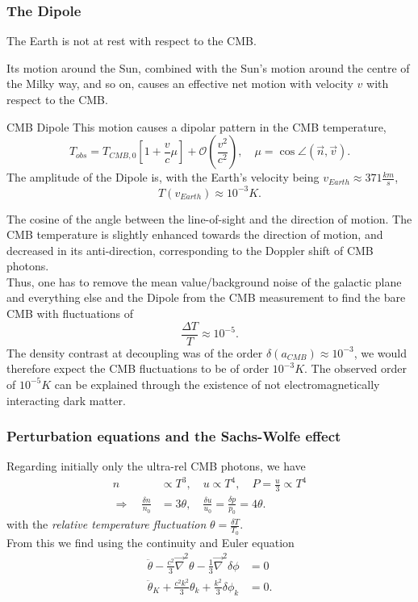 \subsubsection{The Dipole}
\begin{mybox}{}
	The Earth is not at rest with respect to the CMB.
\end{mybox}
Its motion around the Sun, combined with the Sun's motion around the centre of the Milky way, and so on, causes an effective net motion with velocity $v$ with respect to the CMB.
\begin{mybox}{CMB Dipole}
	This motion causes a dipolar pattern in the CMB temperature,\begin{equation}
		T_{obs} = T_{CMB,0} \left[1+\frac{v}{c} \mu\right] + \mathcal{O}\left(\frac{v^2}{c^2}\right), \quad \mu = \cos\angle(\vec{n},\vec{v}).
	\end{equation}
	The amplitude of the Dipole is, with the Earth's velocity being $v_{Earth} \approx 371 \frac{km}{s}$,
	\begin{equation*}
		T(v_{Earth}) \approx 10^{-3}K.
	\end{equation*}
\end{mybox}
The cosine of the angle between the line-of-sight and the direction of motion. The CMB temperature is slightly enhanced towards the direction of motion, and decreased in its anti-direction, corresponding to the Doppler shift of CMB photons.\\
Thus, one has to remove the mean value/background noise of the galactic plane and everything else and the Dipole from the CMB measurement to find the bare CMB with fluctuations of
\begin{equation}
	\frac{\Delta T}{T} \approx 10^{-5}.
\end{equation}
The density contrast at decoupling was of the order $\delta(a_{CMB}) \approx 10^{-3}$, we would therefore expect the CMB fluctuations to be of order $10^{-3}K$. The observed order of $10^{-5}K$ can be explained through the existence of not electromagnetically interacting dark matter.
\subsubsection{Perturbation equations and the Sachs-Wolfe effect}
Regarding initially only the ultra-rel CMB photons, we have
\begin{align}
	n &\propto T^3, \quad u \propto T^4, \quad P=\frac{u}{3} \propto T^4 \\
	\Rightarrow \quad \frac{\delta n}{n_0}& = 3 \theta,\quad \frac{\delta u}{u_0} = \frac{\delta p}{p_0} = 4\theta.
\end{align}
with the \emph{relative temperature fluctuation} $\theta=\frac{\delta T}{T_0}$.\\
From this we find using the continuity and Euler equation
\begin{align}
\ddot{\theta} -\frac{c^2}{3} \vec{\nabla}^2 \theta - \frac{1}{3} \vec{\nabla}^2\delta \phi &=0 \\
\ddot{\theta}_K + \frac{c^2 k^2}{3} \theta_k + \frac{k^2}{3} \delta \phi_k &=0.
\end{align}


